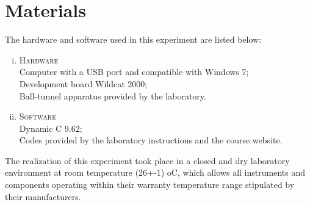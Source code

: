 \section{Materials}

The hardware and software used in this experiment are listed below:

\begin{enumerate}[(i)]
\item \textsc{Hardware} \hfill
\\ Computer with a USB port and compatible with Windows 7;
\\ Development board Wildcat 2000;
\\ Ball-tunnel apparatus provided by the laboratory.
\\
\item \textsc{Software}  \hfill
\\ Dynamic C 9.62;
\\ Codes provided by the laboratory instructions and the course website.
\\
\end{enumerate}

The realization of this experiment took place in a closed and dry laboratory environment at room temperature (26+-1)  oC, which allows all instruments and components operating within their warranty temperature range stipulated by their manufacturers.
